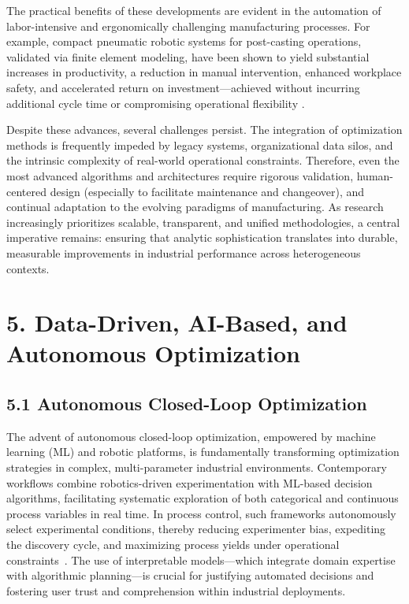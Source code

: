 \documentclass[11pt]{article}
\begin{document}
The practical benefits of these developments are evident in the automation of labor-intensive and ergonomically challenging manufacturing processes. For example, compact pneumatic robotic systems for post-casting operations, validated via finite element modeling, have been shown to yield substantial increases in productivity, a reduction in manual intervention, enhanced workplace safety, and accelerated return on investment—achieved without incurring additional cycle time or compromising operational flexibility \cite{ref62}.

Despite these advances, several challenges persist. The integration of optimization methods is frequently impeded by legacy systems, organizational data silos, and the intrinsic complexity of real-world operational constraints. Therefore, even the most advanced algorithms and architectures require rigorous validation, human-centered design (especially to facilitate maintenance and changeover), and continual adaptation to the evolving paradigms of manufacturing. As research increasingly prioritizes scalable, transparent, and unified methodologies, a central imperative remains: ensuring that analytic sophistication translates into durable, measurable improvements in industrial performance across heterogeneous contexts.

\section{5. Data-Driven, AI-Based, and Autonomous Optimization}

\subsection{5.1 Autonomous Closed-Loop Optimization}

The advent of autonomous closed-loop optimization, empowered by machine learning (ML) and robotic platforms, is fundamentally transforming optimization strategies in complex, multi-parameter industrial environments. Contemporary workflows combine robotics-driven experimentation with ML-based decision algorithms, facilitating systematic exploration of both categorical and continuous process variables in real time. In process control, such frameworks autonomously select experimental conditions, thereby reducing experimenter bias, expediting the discovery cycle, and maximizing process yields under operational constraints~\cite{ref79}. The use of interpretable models—which integrate domain expertise with algorithmic planning—is crucial for justifying automated decisions and fostering user trust and comprehension within industrial deployments.
\end{document}
